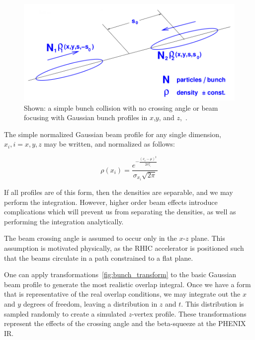 \begin{figure}
  \centering
  \includegraphics[width=0.75\linewidth]{./figures/simple_bunch_head_on.png}
  \caption{
    Shown: a simple bunch collision with no crossing angle or beam focusing with
    Gaussian bunch profiles in $x$,$y$, and $z$,~\cite{Herr2003a}.
  }
  \label{fig:simple_bunch_xing}
\end{figure}

The simple normalized Gaussian beam profile for any single dimension, $x_i, i=x,
y, z$  may be written, and normalized as follows:

\begin{equation}
\label{eq:simplegaussian}
\rho(x_{i}) = \frac{e^{ -\frac{(x_{i}-\mu)^2}{2\sigma_{x_i}^2}}}{\sigma_{x_i}\sqrt{2\pi}}
\end{equation}

{\noindent}If all profiles are of this form, then the densities are separable,
and we may perform the integration. However, higher order beam effects introduce
complications which will prevent us from separating the densities, as well as
performing the integration analytically.

The beam crossing angle is assumed to occur only in the $x$-$z$ plane. This
assumption is motivated physically, as the RHIC accelerator is positioned such
that the beams circulate in a path constrained to a flat plane. 

One can apply transformations~\ref{fig:bunch_transform} to the basic Gaussian
beam profile to generate the most realistic overlap integral. Once we have a
form that is representative of the real overlap conditions, we may integrate out
the $x$ and $y$ degrees of freedom, leaving a distribution in $z$ and $t$. This
distribution is sampled randomly to create a simulated $z$-vertex profile. These
transformations represent the effects of the crossing angle and the beta-squeeze
at the PHENIX IR.


